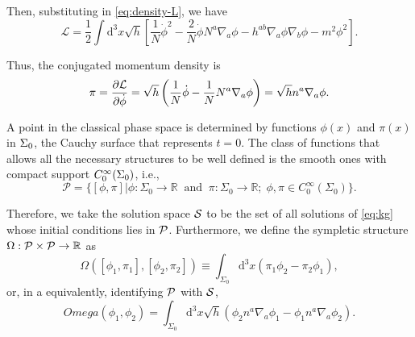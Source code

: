 Then, substituting in \cref{eq:density-L}, we have
\begin{equation}
    \mathcal{L}=\frac{1}{2}\int\mathrm{d}^3x\sqrt{h}\left[\frac{1}{N}\dot{\phi}^2-\frac{2}{N}\dot{\phi}N^a\nabla_a\phi-h^{ab}\nabla_a\phi\nabla_b\phi-m^2\phi^2\right].
\end{equation}

Thus, the conjugated momentum density is
\begin{equation}
    \pi=\diffp{\mathcal{L}}{\dot{{\phi}}}=\sqrt{h}\left(\frac{1}{N}\dot{\phi}-\frac{1}{N}N^a\nabla_a\phi\right)=\sqrt{h}n^a\nabla_a\phi.
    \label{eq:pi}
\end{equation}

A point in the classical phase space is determined by functions \(\phi(x)\) and \(\pi(x)\) in \(\Sigma_0\), the Cauchy surface that represents \(t=0\). The class of functions that allows all the necessary structures to be well defined is the smooth ones with compact support \(C^{\infty}_0(\Sigma_0)\), i.e.,
\begin{equation}
    \mathcal{P}=\{[\phi,\pi]\vert \phi:\Sigma_0\to\mathbb{R}\;\;\text{and}\;\;\pi:\Sigma_0\to\mathbb{R};\;\phi,\pi\in C_0^{\infty}\left(\Sigma_0\right)\}.
\end{equation}

Therefore, we take the solution space \({\mathcal{S}}\) to be the set of all solutions of \cref{eq:kg} whose initial conditions lies in \({\mathcal{P}}\). Furthermore, we define the sympletic structure \(\Omega:{\mathcal{P}}\times{\mathcal{P}}\to{\mathbb{R}}\) as
\begin{equation}
    \Omega\left([\phi_1,\pi_1],[\phi_2,\pi_2]\right)\equiv\int_{\Sigma_0}\mathrm{d}^3x(\pi_1\phi_2-\pi_2\phi_1),
\end{equation}
or, in a equivalently, identifying \({\mathcal{P}}\) with \({\mathcal{S}}\),
\begin{equation}
    Omega(\phi_1,\phi_2)=\int_{\Sigma_0}\mathrm{d}^3x\sqrt{h}\left(\phi_2n^a\nabla_a\phi_1-\phi_1n^a\nabla_a\phi_2\right).
\end{equation}

